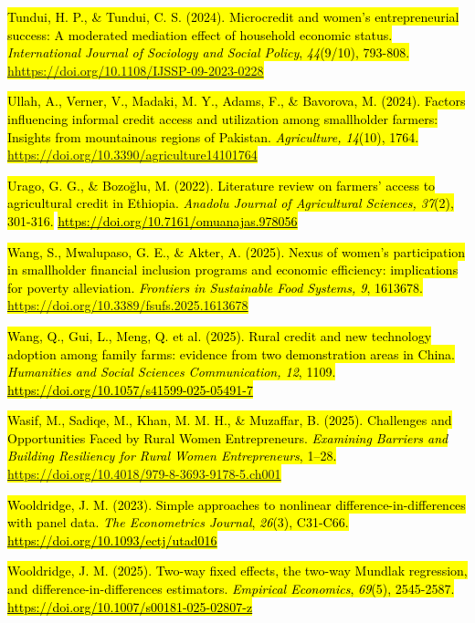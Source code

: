 \hl{Tundui, H. P., \& Tundui, C. S. (2024). Microcredit and women's
entrepreneurial success: A moderated mediation effect of household
economic status. \emph{International Journal of Sociology and Social
Policy}, \emph{44}(9/10), 793-808.
\mbox{\href{https://doi.org/10.1108/IJSSP-09-2023-0228}{\mbox{\href{https://doi.org/10.1108/IJSSP-09-2023-0228}{hhttps://doi.org/10.1108/IJSSP-09-2023-0228}}}}}

\hl{Ullah, A., Verner, V., Madaki, M. Y., Adams, F., \& Bavorova, M.
(2024). Factors influencing informal credit access and utilization among
smallholder farmers: Insights from mountainous regions of Pakistan.
\emph{Agriculture, 14}(10), 1764.
\mbox{\url{https://doi.org/10.3390/agriculture14101764}}}

\hl{Urago, G. G., \& Bozoğlu, M. (2022). Literature review on farmers'
access to agricultural credit in Ethiopia. \emph{Anadolu Journal of
Agricultural Sciences, 37}(2), 301-316.}
\href{https://doi.org/10.7161/omuanajas.978056}{\hl{https://doi.org/10.7161/omuanajas.978056}}

\hl{Wang, S., Mwalupaso, G. E., \& Akter, A. (2025). Nexus of women's
participation in smallholder financial inclusion programs and economic
efficiency: implications for poverty alleviation. \emph{Frontiers in
Sustainable Food Systems, 9}, 1613678.
\mbox{\url{https://doi.org/10.3389/fsufs.2025.1613678}}}

\hl{Wang, Q., Gui, L., Meng, Q. et al. (2025). Rural credit and new
technology adoption among family farms: evidence from two demonstration
areas in China. \emph{Humanities and Social Sciences Communication, 12},
1109.}
\href{https://doi.org/10.1057/s41599-025-05491-7}{\hl{https://doi.org/10.1057/s41599-025-05491-7}}

\hl{Wasif, M., Sadiqe, M., Khan, M. M. H., \& Muzaffar, B. (2025).
Challenges and Opportunities Faced by Rural Women Entrepreneurs.
\emph{Examining Barriers and Building Resiliency for Rural Women
Entrepreneurs}, 1--28.
\mbox{\url{https://doi.org/10.4018/979-8-3693-9178-5.ch001}}}

\hl{Wooldridge, J. M. (2023). Simple approaches to nonlinear
difference-in-differences with panel data. \emph{The Econometrics
Journal}, \emph{26}(3), C31-C66.}
\href{https://doi.org/10.1093/ectj/utad016}{\hl{https://doi.org/10.1093/ectj/utad016}}

\hl{Wooldridge, J. M. (2025). Two-way fixed effects, the two-way Mundlak
regression, and difference-in-differences estimators. \emph{Empirical
Economics}, \emph{69}(5), 2545-2587.}
\href{https://doi.org/10.1007/s00181-025-02807-z}{\hl{https://doi.org/10.1007/s00181-025-02807-z}}

